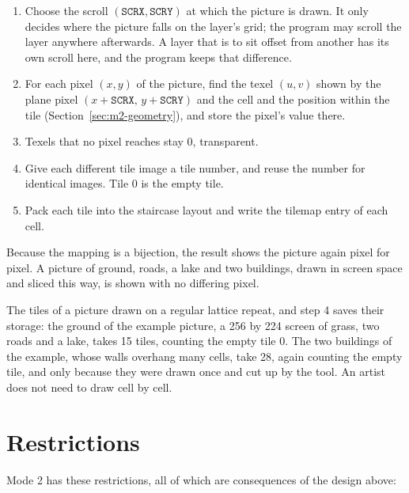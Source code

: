 \begin{enumerate}
	\item Choose the scroll $(\texttt{SCRX}, \texttt{SCRY})$ at which the picture is drawn. It only decides where the picture
	      falls on the layer's grid; the program may scroll the layer anywhere afterwards. A layer that is to sit offset from
	      another has its own scroll here, and the program keeps that difference.
	\item For each pixel $(x, y)$ of the picture, find the texel $(u, v)$ shown by the plane pixel $(x + \texttt{SCRX},\, y +
		      \texttt{SCRY})$ and the cell and the position within the tile (Section~\ref{sec:m2-geometry}), and store the pixel's
	      value there.
	\item Texels that no pixel reaches stay 0, transparent.
	\item Give each different tile image a tile number, and reuse the number for identical images. Tile 0 is the empty tile.
	\item Pack each tile into the staircase layout and write the tilemap entry of each cell.
\end{enumerate}

Because the mapping is a bijection, the result shows the picture again pixel for pixel. A picture of ground, roads, a
lake and two buildings, drawn in screen space and sliced this way, is shown with no differing pixel.

The tiles of a picture drawn on a regular lattice repeat, and step 4 saves their storage: the ground of the example
picture, a 256 by 224 screen of grass, two roads and a lake, takes 15 tiles, counting the empty tile 0. The two
buildings of the example, whose walls overhang many cells, take 28, again counting the empty tile, and only because
they were drawn once and cut up by the tool. An artist does not need to draw cell by cell.

\section{Restrictions}
\label{sec:m2-restrictions}

Mode 2 has these restrictions, all of which are consequences of the design above:

